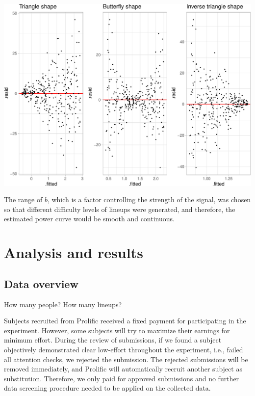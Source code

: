 \documentclass[]{interact}
\theoremstyle{plain}%
\theoremstyle{definition}
\theoremstyle{remark}
\begin{document}
\includegraphics[width=1\linewidth]{paper_comparison_files/figure-latex/different-shape-of-heter-1}

The range of \(b\), which is a factor controlling the strength of the
signal, was chosen so that different difficulty levels of lineups were
generated, and therefore, the estimated power curve would be smooth and
continuous.

\hypertarget{analysis-and-results}{%
\section{Analysis and results}\label{analysis-and-results}}

\hypertarget{data-overview}{%
\subsection{Data overview}\label{data-overview}}

How many people? How many lineups?

Subjects recruited from Prolific received a fixed payment for
participating in the experiment. However, some subjects will try to
maximize their earnings for minimum effort. During the review of
submissions, if we found a subject objectively demonstrated clear
low-effort throughout the experiment, i.e., failed all attention checks,
we rejected the submission. The rejected submissions will be removed
immediately, and Prolific will automatically recruit another subject as
substitution. Therefore, we only paid for approved submissions and no
further data screening procedure needed to be applied on the collected
data.
\end{document}

